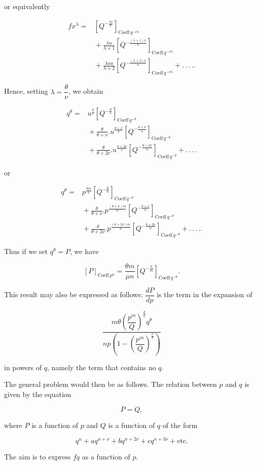 \noindent or equivalently

\[
\begin{aligned}fx^\lambda ={}& \left[Q^{-\frac{\lambda\nu}{n}}\right]_{\text{Coeff}\,q^{-\nu\lambda}}\\ &{}+ \frac{\lambda u}{\lambda+1}\left[Q^{-\frac{(\lambda+1)\nu}{n}}\right]_{\text{Coeff}\,q^{-\nu\lambda}}\\ &{}+ \frac{\lambda uu}{\lambda+2}\left[Q^{-\frac{(\lambda+2)\nu}{n}}\right]_{\text{Coeff}\,q^{-\nu\lambda}}+.\,.\,.\,..
\end{aligned}
\]

\noindent Hence, setting $\lambda = \dfrac{\theta}{\nu}$, we obtain

\[
\begin{aligned}q^\theta ={}& u^{\frac{\theta}{\nu}}\left[Q^{-\frac{\theta}{n}}\right]_{\text{Coeff}\,q^{-\theta}}\\ &{}+ \frac{\theta}{\theta+\nu} .  u^{\frac{\theta+\nu}{\nu}}\left[Q^{-\frac{\theta+\nu}{n}}\right]_{\text{Coeff}\,q^{-\theta}}\\ &{}+ \frac{\theta}{\theta+2\nu} .  u^{\frac{\theta+2\nu}{\nu}}\left[Q^{-\frac{\theta+2\nu}{n}}\right]_{\text{Coeff}\,q^{-\theta}}+.\,.\,.\,.
\end{aligned}
\]

\noindent or

\[
\begin{aligned}q^\theta ={}& p^{\frac{\theta m}{n}}\left[Q^{-\frac{\theta}{n}}\right]_{\text{Coeff}\,q^{-\theta}}\\ &{}+ \frac{\theta}{\theta+\nu} .  p^{\frac{(\theta+\nu)m}{n}}\left[Q^{-\frac{\theta+\nu}{n}}\right]_{\text{Coeff}\,q^{-\theta}}\\ &{}+ \frac{\theta}{\theta+2\nu} .  p^{\frac{(\theta+2\nu)m}{n}}\left[Q^{-\frac{\theta+2\nu}{n}}\right]_{\text{Coeff}\,q^{-\theta}}+.\,.\,.\,..
\end{aligned}
\]

Thus if we set $q^\theta = P$, we have

\[
[P]_{\text{Coeff}\,p^\mu} = \frac{\theta m}{\mu n}\left[Q^{-\frac{\mu}{m}}\right]_{\text{Coeff}\,q^{-\theta}}.
\]

\noindent This result may also be expressed as follows: $\dfrac{dP}{dp}$ is the term in the expansion of

\[
\frac{m\theta\left(\dfrac{p^m}{Q}\right)^{\frac{\theta}{n}}q^\theta}{np\left(1-\left(\dfrac{p^m}{Q}\right)^{\frac{\nu}{n}}\right)}
\]

\noindent in powers of $q$, namely the term that contains no $q$.

The general problem would then be as follows. The relation between $p$ and $q$ is given by the equation

\[
P = Q,
\]

\noindent where $P$ is a function of $p$ and $Q$ is a function of $q$ of the form

\[
q^n+aq^{n+\nu}+bq^{n+2\nu}+cq^{n+3\nu}+\text{etc.}
\]

\noindent The aim is to express $fq$ as a function of $p$.


